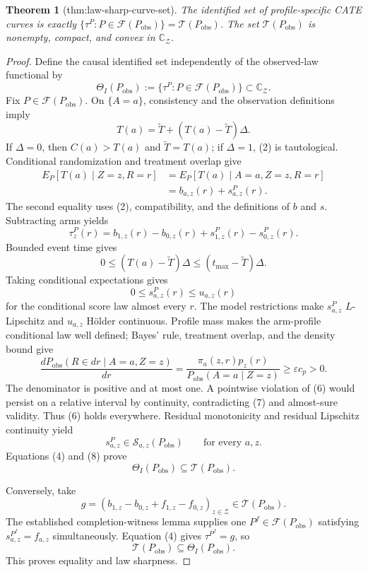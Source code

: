 \documentclass{article}
\newtheorem{theorem}{Theorem}
\begin{document}
\begin{theorem}[thm:law-sharp-curve-set]\label{thm:law-sharp-curve-set}
The identified set of profile-specific CATE curves is exactly \(\{\tau^P:P\in\mathcal F(P_{\mathrm{obs}})\}=\mathcal T(P_{\mathrm{obs}})\). The set \(\mathcal T(P_{\mathrm{obs}})\) is nonempty, compact, and convex in \(\mathbb C_{\mathcal Z}\).
\end{theorem}
\begin{proof}
Define the causal identified set independently of the observed-law functional by
\[
\Theta_I(P_{\mathrm{obs}})
:=\{\tau^P:P\in\mathcal F(P_{\mathrm{obs}})\}
\subset\mathbb C_{\mathcal Z}.
\tag{1}
\]
Fix \(P\in\mathcal F(P_{\mathrm{obs}})\).  On \(\{A=a\}\), consistency and the observation definitions imply
\[
T(a)=\widetilde T+(T(a)-\widetilde T)\Delta.
\tag{2}
\]
If \(\Delta=0\), then \(C(a)>T(a)\) and \(\widetilde T=T(a)\); if \(\Delta=1\), (2) is tautological.  Conditional randomization and treatment overlap give
\[
\begin{aligned}
E_P[T(a)\mid Z=z,R=r]
&=E_P[T(a)\mid A=a,Z=z,R=r]\\
&=b_{a,z}(r)+s^P_{a,z}(r).
\end{aligned}
\tag{3}
\]
The second equality uses (2), compatibility, and the definitions of \(b\) and \(s\).  Subtracting arms yields
\[
\tau_z^P(r)
=b_{1,z}(r)-b_{0,z}(r)+s^P_{1,z}(r)-s^P_{0,z}(r).
\tag{4}
\]
Bounded event time gives
\[
0\leq(T(a)-\widetilde T)\Delta
\leq(t_{\max}-\widetilde T)\Delta.
\tag{5}
\]
Taking conditional expectations gives
\[
0\leq s^P_{a,z}(r)\leq u_{a,z}(r)
\tag{6}
\]
for the conditional score law almost every \(r\).  The model restrictions make \(s^P_{a,z}\) \(L\)-Lipschitz and \(u_{a,z}\) H\"older continuous.  Profile mass makes the arm-profile conditional law well defined; Bayes' rule, treatment overlap, and the density bound give
\[
\frac{dP_{\mathrm{obs}}(R\in dr\mid A=a,Z=z)}{dr}
=\frac{\pi_a(z,r)p_z(r)}
{P_{\mathrm{obs}}(A=a\mid Z=z)}
\geq\varepsilon c_p>0.
\tag{7}
\]
The denominator is positive and at most one.  A pointwise violation of (6) would persist on a relative interval by continuity, contradicting (7) and almost-sure validity.  Thus (6) holds everywhere.  Residual monotonicity and residual Lipschitz continuity yield
\[
s^P_{a,z}\in\mathcal S_{a,z}(P_{\mathrm{obs}})
\qquad\text{for every }a,z.
\tag{8}
\]
Equations (4) and (8) prove
\[
\Theta_I(P_{\mathrm{obs}})\subseteq\mathcal T(P_{\mathrm{obs}}).
\tag{9}
\]

Conversely, take
\[
g=(b_{1,z}-b_{0,z}+f_{1,z}-f_{0,z})_{z\in\mathcal Z}
\in\mathcal T(P_{\mathrm{obs}}).
\]
The established completion-witness lemma supplies one \(P^f\in\mathcal F(P_{\mathrm{obs}})\) satisfying \(s^{P^f}_{a,z}=f_{a,z}\) simultaneously.  Equation (4) gives \(\tau^{P^f}=g\), so
\[
\mathcal T(P_{\mathrm{obs}})\subseteq\Theta_I(P_{\mathrm{obs}}).
\tag{10}
\]
This proves equality and law sharpness.


\end{proof}
\end{document}
